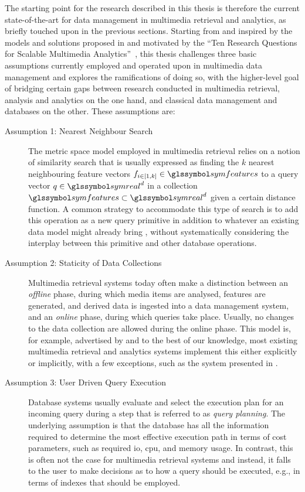 The starting point for the research described in this thesis is therefore the current state-of-the-art for data management in multimedia retrieval and analytics, as briefly touched upon in the previous sections. Starting from and inspired by the models and solutions proposed in \cite{Giangreco:2016Adam,Giangreco:2018Database} and motivated by the ``Ten Research Questions for Scalable Multimedia Analytics''~\cite{Jonsson:2016Ten}, this thesis challenges three basic assumptions currently employed and operated upon in multimedia data management and explores the ramifications of doing so, with the higher-level goal of bridging certain gaps between research conducted in multimedia retrieval, analysis and analytics on the one hand, and classical data management and databases on the other. These assumptions are:

\begin{description}
    \item[Assumption 1: Nearest Neighbour Search] The metric space model employed in multimedia retrieval \cite{Zezula:2006Similarity} relies on a notion of similarity search that is usually expressed as finding the $k$ nearest neighbouring feature vectors $f_{i \in \left[1,k\right]} \in \symfeatures$ to a query vector $q \in \symreal^d$ in a collection $\symfeatures \subset \symreal^d$ given a certain distance function. A common strategy to accommodate this type of search is to add this operation as a new query primitive in addition to whatever an existing data model might already bring \cite{Guliato:2009PostgreSQL,Giangreco:2016Adam,Yang:2020Pase}, without systematically considering the interplay between this primitive and other database operations.

    \item[Assumption 2: Staticity of Data Collections] Multimedia retrieval systems today often make a distinction between an \emph{offline} phase, during which media items are analysed, features are generated, and derived data is ingested into a data management system, and an \emph{online} phase, during which queries take place. Usually, no changes to the data collection are allowed during the online phase. This model is, for example, advertised by \cite{Flickner:1995Query,Kiranyaz:2003Muvis,Giangreco:2018Database,Rossetto:2018Multi} and to the best of our knowledge, most existing multimedia retrieval and analytics systems implement this either explicitly or implicitly, with a few exceptions, such as the system presented in \cite{Wang:2021Milvus}.

    \item[Assumption 3: User Driven Query Execution] Database systems usually evaluate and select the execution plan for an incoming query during a step that is referred to as \emph{query planning}. The underlying assumption is that the database has all the information required to determine the most effective execution path in terms of cost parameters, such as required \acrshort{io}, \acrshort{cpu}, and memory usage. In contrast, this is often not the case for multimedia retrieval systems and instead, it falls to the user to make decisions as to how a query should be executed, e.g., in terms of indexes that should be employed.
\end{description}

